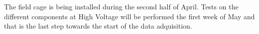 The field cage is being installed during the second half of April. Tests on the different components at High Voltage will be performed the first week of May and that is the last step towards the start of the data adquisition.

%
%
%



